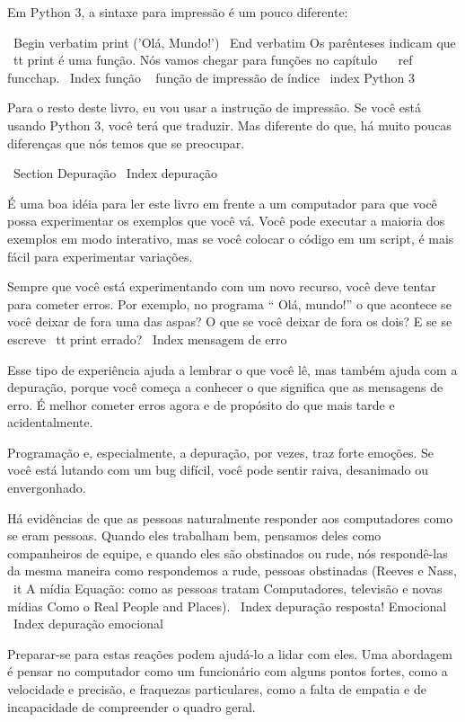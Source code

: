 \documentclass[10pt]{book}
\begin{document}
{Em Python 3, a sintaxe para impressão é um pouco diferente:

\ Begin {verbatim}
print ('Olá, Mundo!')
\ End {verbatim}
%
Os parênteses indicam que {\ tt print} é uma função. Nós vamos chegar
para funções no capítulo ~ \ ref {} funcchap.
\ Index {função} \ {} função de impressão de índice \ index {Python 3}

Para o resto deste livro, eu vou usar a instrução de impressão. Se você
está usando Python 3, você terá que traduzir. Mas diferente do
que, há muito poucas diferenças que nós temos que se preocupar.


\ Section {} Depuração
\ Index {depuração}

É uma boa idéia para ler este livro em frente a um computador para que você possa
experimentar os exemplos que você vá. Você pode executar a maioria dos exemplos em
modo interativo, mas se você colocar o código em um script, é mais fácil
para experimentar variações.

Sempre que você está experimentando com um novo recurso, você deve tentar
para cometer erros. Por exemplo, no programa `` Olá, mundo!''
o que acontece se você deixar de fora uma das aspas? O que
se você deixar de fora os dois? E se se escreve {\ tt print} errado?
\ Index {mensagem de erro}

Esse tipo de experiência ajuda a lembrar o que você lê, mas também ajuda
com a depuração, porque você começa a conhecer o que significa que as mensagens de erro.
É melhor cometer erros agora e de propósito do que mais tarde
e acidentalmente.

Programação e, especialmente, a depuração, por vezes, traz forte
emoções. Se você está lutando com um bug difícil, você pode
sentir raiva, desanimado ou envergonhado.

Há evidências de que as pessoas naturalmente responder aos computadores como se
eram pessoas. Quando eles trabalham bem, pensamos
deles como companheiros de equipe, e quando eles são obstinados ou rude, nós
respondê-las da mesma maneira como respondemos a rude,
pessoas obstinadas (Reeves e Nass, {\ it A mídia
    Equação: como as pessoas tratam Computadores, televisão e novas mídias
    Como o Real People and Places}).
\ Index {depuração resposta! Emocional}
\ Index {depuração emocional}

Preparar-se para estas reações podem ajudá-lo a lidar com eles.
Uma abordagem é pensar no computador como um funcionário com
alguns pontos fortes, como a velocidade e precisão, e
fraquezas particulares, como a falta de empatia e de incapacidade
de compreender o quadro geral.

}
\end{document}
